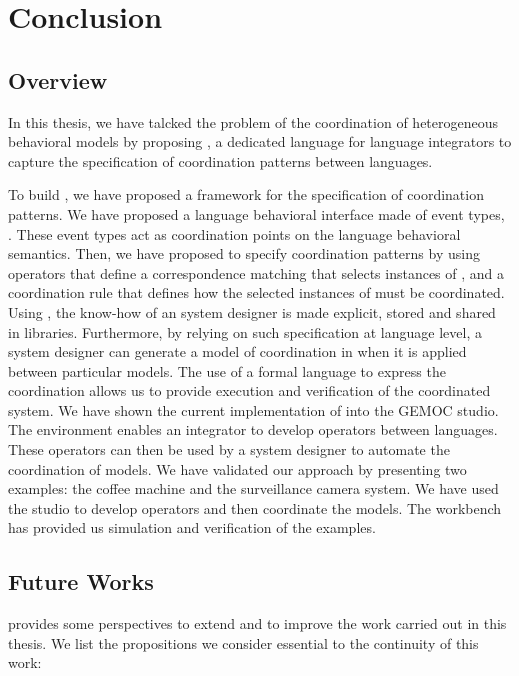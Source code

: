 \chapter{Conclusion}
\label{ch:conclusions}

\section{Overview}

In this thesis, we have talcked the problem of the coordination of heterogeneous behavioral models by proposing \bcool, a dedicated language for language integrators to capture the specification of coordination patterns between languages. 
	
To build \bcool, we have proposed a framework for the specification of coordination patterns. We have proposed a language behavioral interface made of event types, \ie \dse. These event types act as coordination points on the language behavioral semantics. Then, we have proposed to specify coordination patterns by using operators that define a correspondence matching that selects instances of \dse, and a coordination rule that defines how the selected instances of \dse must be coordinated. Using \bcool, the know-how of an system designer is made explicit, stored and shared in libraries. Furthermore, by relying on such specification at language level, a system designer can generate a model of coordination in \ccsl when it is applied between particular models. The use of a formal language to express the coordination allows us to provide execution and verification of the coordinated system. We have shown the current implementation of \bcool into the GEMOC studio. The environment enables an integrator to develop operators between languages. These operators can then be used by a system designer to automate the coordination of models. We have validated our approach by presenting two examples: the coffee machine and the surveillance camera system. We have used the studio to develop operators and then coordinate the models. The workbench has provided us simulation and verification of the examples. 
	  
\section{Future Works}
\bcool provides some perspectives to extend and to improve the work carried out in this thesis. We list the propositions we consider essential to the continuity of this work:

